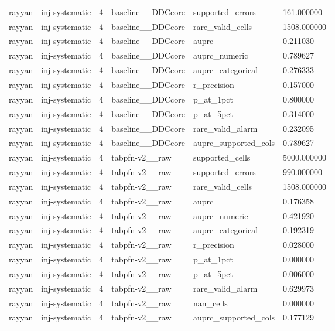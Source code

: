 \begin{tabular}{llllll}
rayyan & inj-systematic & 4 & baseline\_\_DDCcore & supported\_errors & 161.000000 \\
rayyan & inj-systematic & 4 & baseline\_\_DDCcore & rare\_valid\_cells & 1508.000000 \\
rayyan & inj-systematic & 4 & baseline\_\_DDCcore & auprc & 0.211030 \\
rayyan & inj-systematic & 4 & baseline\_\_DDCcore & auprc\_numeric & 0.789627 \\
rayyan & inj-systematic & 4 & baseline\_\_DDCcore & auprc\_categorical & 0.276333 \\
rayyan & inj-systematic & 4 & baseline\_\_DDCcore & r\_precision & 0.157000 \\
rayyan & inj-systematic & 4 & baseline\_\_DDCcore & p\_at\_1pct & 0.800000 \\
rayyan & inj-systematic & 4 & baseline\_\_DDCcore & p\_at\_5pct & 0.314000 \\
rayyan & inj-systematic & 4 & baseline\_\_DDCcore & rare\_valid\_alarm & 0.232095 \\
rayyan & inj-systematic & 4 & baseline\_\_DDCcore & auprc\_supported\_cols & 0.789627 \\
rayyan & inj-systematic & 4 & tabpfn-v2\_\_raw & supported\_cells & 5000.000000 \\
rayyan & inj-systematic & 4 & tabpfn-v2\_\_raw & supported\_errors & 990.000000 \\
rayyan & inj-systematic & 4 & tabpfn-v2\_\_raw & rare\_valid\_cells & 1508.000000 \\
rayyan & inj-systematic & 4 & tabpfn-v2\_\_raw & auprc & 0.176358 \\
rayyan & inj-systematic & 4 & tabpfn-v2\_\_raw & auprc\_numeric & 0.421920 \\
rayyan & inj-systematic & 4 & tabpfn-v2\_\_raw & auprc\_categorical & 0.192319 \\
rayyan & inj-systematic & 4 & tabpfn-v2\_\_raw & r\_precision & 0.028000 \\
rayyan & inj-systematic & 4 & tabpfn-v2\_\_raw & p\_at\_1pct & 0.000000 \\
rayyan & inj-systematic & 4 & tabpfn-v2\_\_raw & p\_at\_5pct & 0.006000 \\
rayyan & inj-systematic & 4 & tabpfn-v2\_\_raw & rare\_valid\_alarm & 0.629973 \\
rayyan & inj-systematic & 4 & tabpfn-v2\_\_raw & nan\_cells & 0.000000 \\
rayyan & inj-systematic & 4 & tabpfn-v2\_\_raw & auprc\_supported\_cols & 0.177129 \\

\end{tabular}
